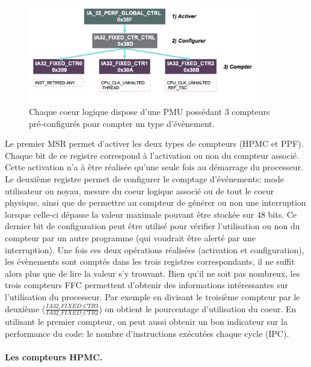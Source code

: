             \begin{figure}[h!]
            \center
            \includegraphics[width=10cm]{images/edl_perf_ffc.png}
            \caption{\label{pic:edl_perf_ffc} Chaque coeur logique dispose d'une PMU possédant 3 compteurs pré-configurés pour compter un type d'évènement.}
            \end{figure}
        
            Le premier MSR permet d'activer les deux types de compteurs (HPMC et PPF). Chaque bit de ce registre correspond à l'activation ou non du compteur associé. Cette activation n'a à être réalisée qu'une seule fois au démarrage du processeur. Le deuxième registre permet de configurer le comptage d'événements: mode utilisateur ou noyau, mesure du coeur logique associé ou de tout le coeur physique, ainsi que de permettre au compteur de générer ou non une interruption lorsque celle-ci dépasse la valeur maximale pouvant être stockée sur 48 bits. Ce dernier bit de configuration peut être utilisé pour vérifier l'utilisation ou non du compteur par un autre programme (qui voudrait être alerté par une interruption). Une fois ces deux opérations réalisées (activation et configuration), les évènements sont comptés dans les trois registres correspondants, il ne suffit alors plus que de lire la valeur s'y trouvant. Bien qu'il ne soit pas nombreux, les trois compteurs FFC permettent d'obtenir des informations intéressantes sur l'utilisation du processeur. Par exemple en divisant le troisième compteur par le deuxième ($\frac{IA32\_FIXED\_CTR3}{IA32\_FIXED\_CTR2}$) on obtient le pourcentage d'utilisation du coeur. En utilisant le premier compteur, on peut aussi obtenir un bon indicateur sur la performance du code: le nombre d'instructions exécutées chaque cycle (IPC).
        
       
        
        
        
        \paragraph{Les compteurs HPMC.} 
            

